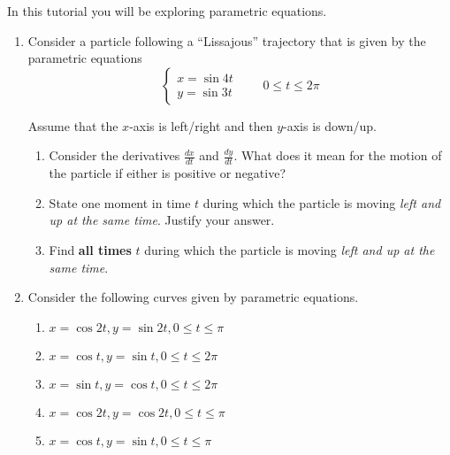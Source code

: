 \begin{objectives}
    In this tutorial you will be exploring parametric equations.
\end{objectives}

\begin{enumerate}
    \item Consider a particle following a ``Lissajous'' trajectory that is given by the parametric equations
    \[
    \begin{cases}
        x=\sin{4t}\\
        y=\sin{3t}
    \end{cases}\qquad 0 \leq t \leq 2\pi
    \]

    Assume that the $x$-axis is left/right and then $y$-axis is down/up.
    
    \begin{enumerate}
        \item Consider the derivatives $\frac{dx}{dt}$ and $\frac{dy}{dt}$. What does it mean for the motion of the particle if either is positive or negative?

        \item State one moment in time $t$ during which the particle is moving \textit{left and up at the same time}. Justify your answer.

        \item Find \textbf{all times} $t$ during which the particle is moving \textit{left and up at the same time}.
        
    \end{enumerate}

    \item Consider the following curves given by parametric equations.

    \begin{tcolorbox}[sharp corners=all,colframe=tolGrey,colback=white]
    \begin{multicols}{2}
    \begin{enumerate}[label={(\roman{enumii})},nosep,itemsep=1mm]
        \item $x = \cos{2t}, y = \sin{2t}, 0 \leq t \leq \pi$
        \item $x = \cos{t}, y = \sin{t}, 0 \leq t \leq 2\pi$
        \item $x = \sin{t}, y = \cos{t}, 0 \leq t \leq 2\pi$
        \item $x = \cos{2t}, y = \cos{2t}, 0 \leq t \leq \pi$
        \item $x = \cos{t}, y = \sin{t}, 0 \leq t \leq \pi$
    \end{enumerate}
    \end{multicols}
    \end{tcolorbox}
    

\end{enumerate}
